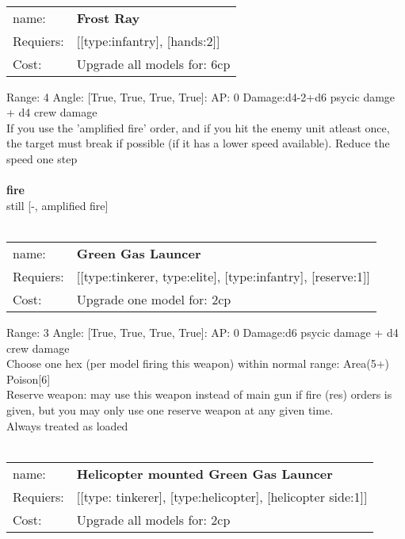 \ \\
\begin{tabular}{ll}
name: & {\bf Frost Ray } \\
Requiers: & [[type:infantry], [hands:2]] \\
Cost: & Upgrade all models for: 6cp \\
\end{tabular}



Range: 4  Angle: [True, True, True, True]: AP: 0 Damage:d4-2+d6 psycic damge + d4 crew damage \\
If you use the 'amplified fire' order, and if you hit the enemy unit atleast once, the target must break if possible (if it has a lower speed available). Reduce the speed one step\\ 







\ \\ {\bf fire } \\
still [-, amplified fire] \\

\ \\
\begin{tabular}{ll}
name: & {\bf Green Gas Launcer } \\
Requiers: & [[type:tinkerer, type:elite], [type:infantry], [reserve:1]] \\
Cost: & Upgrade one model for: 2cp \\
\end{tabular}



Range: 3  Angle: [True, True, True, True]: AP: 0 Damage:d6 psycic damage + d4 crew damage \\
Choose one hex (per model firing this weapon) within normal range: Area(5+)\\ 
Poison[6]\\ 
Reserve weapon: may use this weapon instead of main gun if fire (res) orders is given, but you may only use one reserve weapon at any given time.\\ 
Always treated as loaded\\ 








\ \\
\begin{tabular}{ll}
name: & {\bf Helicopter mounted Green Gas Launcer } \\
Requiers: & [[type: tinkerer], [type:helicopter], [helicopter side:1]] \\
Cost: & Upgrade all models for: 2cp \\
\end{tabular}



